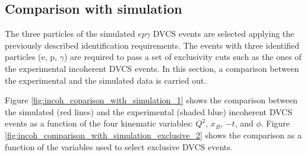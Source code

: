\subsection{Comparison with simulation}
The three particles of the simulated $ep\gamma$ DVCS events are selected 
applying the previously described identification requirements. The events with 
three identified particles (e, p, $\gamma$) are required to pass a set of 
exclusivity cuts such as the ones of the experimental incoherent DVCS events.  
In this section, a comparison between the experimental and the simulated data 
is carried out.

Figure \ref{fig:incoh_coparison_with_simulation_1} shows the comparison between 
the simulated (red lines) and the experimental (shaded blue) incoherent DVCS 
events as a function of the four kinematic variables: $Q^{2}$, $x_{B}$, $-t$, 
and $\phi$. Figure \ref{fig:incoh_comparison_with_simulation_exclusive_2} shows 
the comparison as a function of the variables used to select exclusive DVCS 
events.
